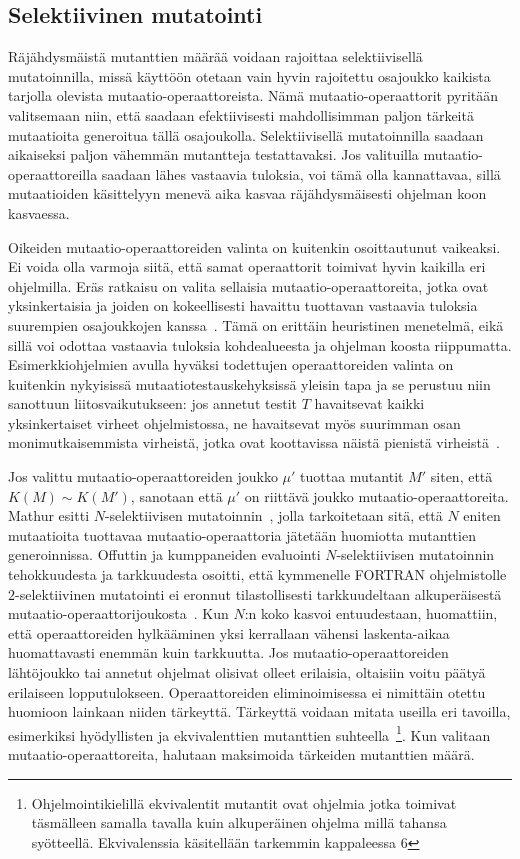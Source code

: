 \documentclass[finnish]{tktltiki2}
\begin{document}
\subsection{Selektiivinen mutatointi}
Räjähdysmäistä mutanttien määrää voidaan rajoittaa selektiivisellä mutatoinnilla, missä käyttöön otetaan vain hyvin rajoitettu osajoukko kaikista tarjolla olevista mutaatio-operaattoreista. Nämä mutaatio-operaattorit pyritään valitsemaan niin, että saadaan efektiivisesti mahdollisimman paljon tärkeitä mutaatioita generoitua tällä osajoukolla. Selektiivisellä mutatoinnilla saadaan aikaiseksi paljon vähemmän mutantteja testattavaksi. Jos valituilla mutaatio-operaattoreilla saadaan lähes vastaavia tuloksia, voi tämä olla kannattavaa, sillä mutaatioiden käsittelyyn menevä aika kasvaa räjähdysmäisesti ohjelman koon kasvaessa. 

Oikeiden mutaatio-operaattoreiden valinta on kuitenkin osoittautunut vaikeaksi. Ei voida olla varmoja siitä, että samat operaattorit toimivat hyvin kaikilla eri ohjelmilla. Eräs ratkaisu on valita sellaisia mutaatio-operaattoreita, jotka ovat yksinkertaisia ja joiden on kokeellisesti havaittu tuottavan vastaavia tuloksia suurempien osajoukkojen kanssa~\cite{GrunSZ09}. Tämä on erittäin heuristinen menetelmä, eikä sillä voi odottaa vastaavia tuloksia kohdealueesta ja ohjelman koosta riippumatta. Esimerkkiohjelmien avulla hyväksi todettujen operaattoreiden valinta on kuitenkin nykyisissä mutaatiotestauskehyksissä yleisin tapa ja se perustuu niin sanottuun liitosvaikutukseen: jos annetut testit $T$ havaitsevat kaikki yksinkertaiset virheet ohjelmistossa, ne havaitsevat myös suurimman osan monimutkaisemmista virheistä, jotka ovat koottavissa näistä pienistä virheistä~\cite{DeMilloLS78}. 

Jos valittu mutaatio-operaattoreiden joukko $\mu'$ tuottaa mutantit $M'$ siten, että $K(M) \sim K(M')$, sanotaan että $\mu'$ on riittävä joukko mutaatio-operaattoreita. Mathur esitti $N$-selektiivisen mutatoinnin~\cite{Mathur91}, jolla tarkoitetaan sitä, että $N$ eniten mutaatioita tuottavaa mutaatio-operaattoria jätetään huomiotta mutanttien generoinnissa. Offuttin ja kumppaneiden evaluointi $N$-selektiivisen mutatoinnin tehokkuudesta ja tarkkuudesta osoitti, että kymmenelle FORTRAN ohjelmistolle $2$-selektiivinen mutatointi ei eronnut tilastollisesti tarkkuudeltaan alkuperäisestä mutaatio-operaattorijoukosta~\cite{OffuttRZ93}. Kun $N$:n koko kasvoi entuudestaan, huomattiin, että operaattoreiden hylkääminen yksi kerrallaan vähensi laskenta-aikaa huomattavasti enemmän kuin tarkkuutta. Jos mutaatio-operaattoreiden lähtöjoukko tai annetut ohjelmat olisivat olleet erilaisia, oltaisiin voitu päätyä erilaiseen lopputulokseen. Operaattoreiden eliminoimisessa ei nimittäin otettu huomioon lainkaan niiden tärkeyttä. Tärkeyttä voidaan mitata useilla eri tavoilla, esimerkiksi hyödyllisten ja ekvivalenttien mutanttien suhteella~\footnote{Ohjelmointikielillä ekvivalentit mutantit ovat ohjelmia jotka toimivat täsmälleen samalla tavalla kuin alkuperäinen ohjelma millä tahansa syötteellä. Ekvivalenssia käsitellään tarkemmin kappaleessa 6}. Kun valitaan mutaatio-operaattoreita, halutaan maksimoida tärkeiden mutanttien määrä.
\end{document}
